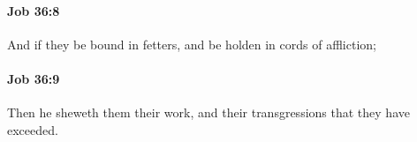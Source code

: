 		\paragraph{Job 36:8} %
			\label{JOB-36-8}

			And if they be bound in fetters, and be holden in cords of affliction;


		\paragraph{Job 36:9} %
			\label{JOB-36-9}

			Then he sheweth them their work, and their transgressions that they have exceeded.


